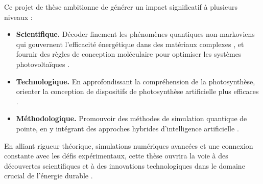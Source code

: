 \documentclass[12pt, a4paper]{article}
\begin{document}
Ce projet de thèse ambitionne de générer un impact significatif à plusieurs niveaux :
\begin{itemize}
    \item \textbf{Scientifique.} Décoder finement les phénomènes quantiques non-markoviens qui gouvernent l'efficacité énergétique dans des matériaux complexes \cite{Ablimit2024, Dutta2024}, et fournir des règles de conception moléculaire pour optimiser les systèmes photovoltaïques \cite{Navadel2025}.

    \item \textbf{Technologique.} En approfondissant la compréhension de la photosynthèse, orienter la conception de dispositifs de photosynthèse artificielle plus efficaces \cite{Tang2023, Yan2023}.

    \item \textbf{Méthodologique.} Promouvoir des méthodes de simulation quantique de pointe, en y intégrant des approches hybrides d'intelligence artificielle \cite{Dan2024, Seneviratne2024}.
\end{itemize}

En alliant rigueur théorique, simulations numériques avancées et une connexion constante avec les défis expérimentaux, cette thèse ouvrira la voie à des découvertes scientifiques et à des innovations technologiques dans le domaine crucial de l'énergie durable \cite{Metzler2023}.

\newpage



\end{document}
